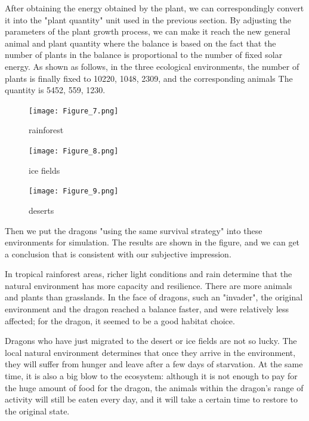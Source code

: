 \documentclass{mcmthesis}
\begin{document}
After obtaining the energy obtained by the plant, we can correspondingly convert it into the "plant quantity" unit used in the previous section. By adjusting the parameters of the plant growth process, we can make it reach the new general animal and plant quantity where the balance is based on the fact that the number of plants in the balance is proportional to the number of fixed solar energy. As shown as follows, in the three ecological environments, the number of plants is finally fixed to 10220, 1048, 2309, and the corresponding animals The quantity is 5452, 559, 1230.

\begin{figure}[h]
    \centering
    \texttt{[image: Figure\_7.png]}
    \caption{rainforest}\label{fig:simulate6}
\end{figure}

\begin{figure}[h]
    \centering
    \texttt{[image: Figure\_8.png]}
    \caption{ice fields}\label{fig:simulate7}
\end{figure}

\begin{figure}[h]
    \centering
    \texttt{[image: Figure\_9.png]}
    \caption{deserts}\label{fig:simulate8}
\end{figure}

Then we put the dragons "using the same survival strategy" into these environments for simulation. The results are shown in the figure, and we can get a conclusion that is consistent with our subjective impression.

In tropical rainforest areas, richer light conditions and rain determine that the natural environment has more capacity and resilience. There are more animals and plants than grasslands. In the face of dragons, such an "invader", the original environment and the dragon reached a balance faster, and were relatively less affected; for the dragon, it seemed to be a good habitat choice.

Dragons who have just migrated to the desert or ice fields are not so lucky. The local natural environment determines that once they arrive in the environment, they will suffer from hunger and leave after a few days of starvation. At the same time, it is also a big blow to the ecosystem: although it is not enough to pay for the huge amount of food for the dragon, the animals within the dragon's range of activity will still be eaten every day, and it will take a certain time to restore to the original state.
\end{document}
